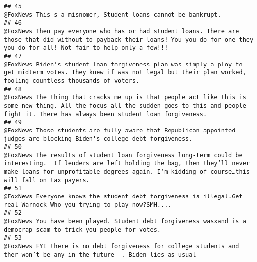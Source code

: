 \documentclass[
]{article}
\begin{document}
\begin{verbatim}
## 45                                                                                                                                                                                                                                           @FoxNews This s a misnomer, Student loans cannot be bankrupt.
## 46                                                                                                                @FoxNews Then pay everyone who has or had student loans. There are those that did without to payback their loans! You you do for one they you do for all! Not fair to help only a few!!!
## 47                                                                                                                         @FoxNews Biden's student loan forgiveness plan was simply a ploy to get midterm votes. They knew if was not legal but their plan worked, fooling countless thousands of voters.
## 48                                                                                                     @FoxNews The thing that cracks me up is that people act like this is some new thing. All the focus all the sudden goes to this and people fight it. There has always been student loan forgiveness.
## 49                                                                                                                                                                                 @FoxNews Those students are fully aware that Republican appointed judges are blocking Biden's college debt forgiveness.
## 50                                                                @FoxNews The results of student loan forgiveness long-term could be interesting.  If lenders are left holding the bag, then they’ll never make loans for unprofitable degrees again. I’m kidding of course…this will fall on tax payers.
## 51                                                                                                                                                                                     @FoxNews Everyone knows the student debt forgiveness is illegal.Get real Warnock Who you trying to play now?SMH....
## 52                                                                                                                                                                                       @FoxNews You have been played. Student debt forgiveness wasxand is a democrap scam to trick you people for votes.
## 53                                                                                                                                                                               @FoxNews FYI there is no debt forgiveness for college students and ther won’t be any in the future  . Biden lies as usual

\end{verbatim}
\end{document}
